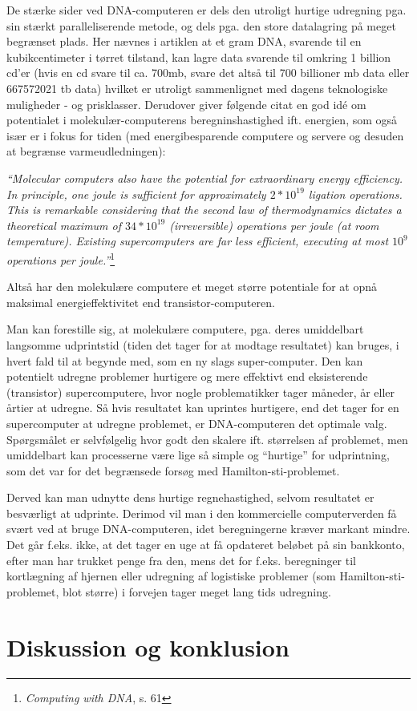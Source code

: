 \documentclass[10pt,a4paper]{article}
\newcommand{\citat}[2]{\begin{justify}\textit{``#1''}\hspace{0.1cm}\footnote{#2}\end{justify}}
\begin{document}
De stærke sider ved DNA-computeren er dels den utroligt hurtige udregning pga. 
sin stærkt paralleliserende metode, og dels pga. den store datalagring på meget 
begrænset plads. Her nævnes i artiklen at et gram DNA, svarende til en 
kubikcentimeter i tørret tilstand, kan lagre data svarende til omkring 1
billion cd'er (hvis en cd svare til ca. 700mb, svare det altså til 700 billioner
mb data eller 667572021 tb data) hvilket er utroligt sammenlignet med dagens
teknologiske muligheder - og prisklasser. Derudover giver følgende citat en god 
idé om potentialet i molekulær-computerens beregninshastighed ift. energien, 
som også især er i fokus for tiden (med energibesparende computere og servere 
og desuden at begrænse varmeudledningen):
\citat{Molecular computers also have the potential for extraordinary energy 
efficiency. In principle, one joule is sufficient for approximately $2*10^{19}$ 
ligation operations. This is remarkable considering that the second law of 
thermodynamics dictates a theoretical maximum of $34*10^{19}$ (irreversible) 
operations per joule (at room temperature). Existing supercomputers are far
less efficient, executing at most $10^{9}$ operations per
joule.}{\textit{Computing with DNA}, s. 61}
Altså har den molekulære computere et meget større potentiale for at opnå 
maksimal energieffektivitet end transistor-computeren.

Man kan forestille sig, at molekulære computere, pga. deres umiddelbart 
langsomme udprintstid (tiden det tager for at modtage resultatet) kan bruges, i 
hvert fald til at begynde med, som en ny slags super-computer. Den kan 
potentielt udregne problemer hurtigere og mere effektivt end eksisterende
(transistor) supercomputere, hvor nogle problematikker tager måneder, år eller
årtier at udregne. Så hvis resultatet kan uprintes hurtigere, end det tager for
en supercomputer at udregne problemet, er DNA-computeren det optimale valg.
Spørgsmålet er selvfølgelig hvor godt den skalere ift. størrelsen af problemet,
men umiddelbart kan processerne være lige så simple og ``hurtige'' for
udprintning, som det var for det begrænsede forsøg med Hamilton-sti-problemet.

Derved kan man udnytte dens hurtige regnehastighed, selvom resultatet er
besværligt at udprinte. Derimod vil man i den kommercielle computerverden få
svært ved at bruge DNA-computeren, idet beregningerne kræver markant mindre. Det
går f.eks. ikke, at det tager en uge at få opdateret beløbet på sin bankkonto,
efter man har trukket penge fra den, mens det for f.eks. beregninger til
kortlægning af hjernen eller udregning af logistiske problemer (som
Hamilton-sti-problemet, blot større) i forvejen tager meget lang tids udregning.

\section{Diskussion og konklusion}
\end{document}
